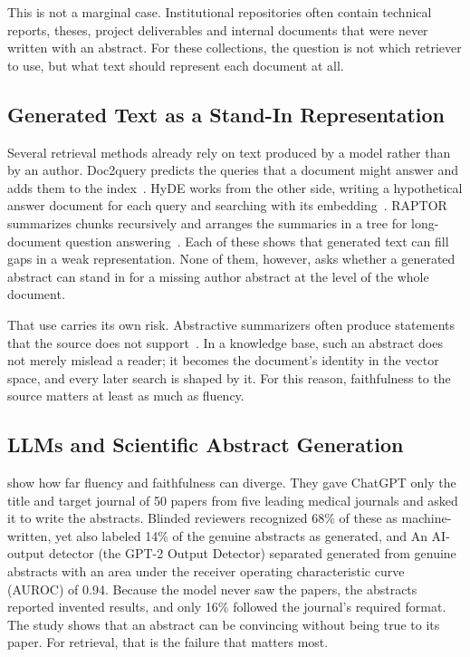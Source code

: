 \documentclass[bdcc,article,submit,pdftex,moreauthors]{Definitions/mdpi}
\begin{document}
This is not a marginal case. Institutional repositories often contain technical reports, theses, project deliverables and internal documents that were never written with an abstract. For these collections, the question is not which retriever to use, but what text should represent each document at all.

\subsection{Generated Text as a Stand-In Representation}

Several retrieval methods already rely on text produced by a model rather than by an author. Doc2query predicts the queries that a document might answer and adds them to the index~\citep{nogueira2019document}. HyDE works from the other side, writing a hypothetical answer document for each query and searching with its embedding~\citep{gao2023precise}. RAPTOR summarizes chunks recursively and arranges the summaries in a tree for long-document question answering~\citep{sarthi2024raptor}. Each of these shows that generated text can fill gaps in a weak representation. None of them, however, asks whether a generated abstract can stand in for a missing author abstract at the level of the whole document.

That use carries its own risk. Abstractive summarizers often produce statements that the source does not support~\citep{maynez2020faithfulness}. In a knowledge base, such an abstract does not merely mislead a reader; it becomes the document's identity in the vector space, and every later search is shaped by it. For this reason, faithfulness to the source matters at least as much as fluency.

\subsection{LLMs and Scientific Abstract Generation}

\citet{gao2023comparing} show how far fluency and faithfulness can diverge. They gave ChatGPT only the title and target journal of 50 papers from five leading medical journals and asked it to write the abstracts. Blinded reviewers recognized 68\% of these as machine-written, yet also labeled 14\% of the genuine abstracts as generated, and An AI-output detector (the GPT-2 Output Detector) separated generated from genuine abstracts with an area under the receiver operating characteristic curve (AUROC) of 0.94. Because the model never saw the papers, the abstracts reported invented results, and only 16\% followed the journal's required format. The study shows that an abstract can be convincing without being true to its paper. For retrieval, that is the failure that matters most.
\end{document}
